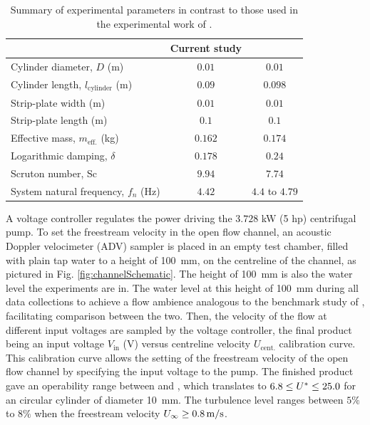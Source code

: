 \documentclass[oneside]{utmthesis}
\begin{document}
\begin{table}[!ht]
\centering
\caption{Summary of experimental parameters in contrast to those used in the experimental work of \citet{Koide2013}.} \label{tab:expParameter}
\vspace{\baselineskip}
\begin{tabular}{l c c}
  \hline
  \hline
                                           & Current study & \citet{Koide2013}\\
  \hline
Cylinder diameter, $D$ (m)                 & $0.01$        & $0.01$           \\
Cylinder length, $l_{\text{cylinder}}$ (m) & $0.09$        & $0.098$          \\
Strip-plate width (m)                      & $0.01$        & $0.01$           \\
Strip-plate length (m)                     & $0.1$         & $0.1$            \\
Effective mass, $m_{\text{eff.}}$ (kg)     & $0.162$       & $0.174$          \\
Logarithmic damping, $\delta$              & $0.178$       & $0.24$           \\
Scruton number, Sc                         & $9.94$        & $7.74$           \\
System natural frequency, $f_{n}$ (Hz)     & $4.42$        & $4.4$ to $4.79$  \\
  \hline
  \hline
\end{tabular}
\end{table}

A voltage controller regulates the power driving the $3.728$ kW (5 hp) centrifugal pump. To set the freestream velocity in the open flow channel, an acoustic Doppler velocimeter (ADV) sampler is placed in an empty test chamber, filled with plain tap water to a height of \SI{100}{\milli\metre}, on the centreline of the channel, as pictured in Fig. \ref{fig:channelSchematic}. The height of \SI{100}{\milli\metre} is also the water level the experiments are in. The water level at this height of \SI{100}{\milli\metre} during all data collections to achieve a flow ambience analogous to the benchmark study of \citet{Koide2013}, facilitating comparison between the two. Then, the velocity of the flow at different input voltages are sampled by the voltage controller, the final product being an input voltage $V_{\text{in}}$ (V) versus centreline velocity $U_{\text{cent.}}$ calibration curve. This calibration curve allows the setting of the freestream velocity of the open flow channel by specifying the input voltage to the pump. The finished product gave an operability range between \uth{} and \uel{}, which translates to $6.8 \leq U^{*} \leq 25.0$ for an circular cylinder of diameter \SI{10}{\milli\metre}. The turbulence level ranges between $5\%$ to $8\%$ when the freestream velocity $U_{\infty} \geq \uei$.
\end{document}

